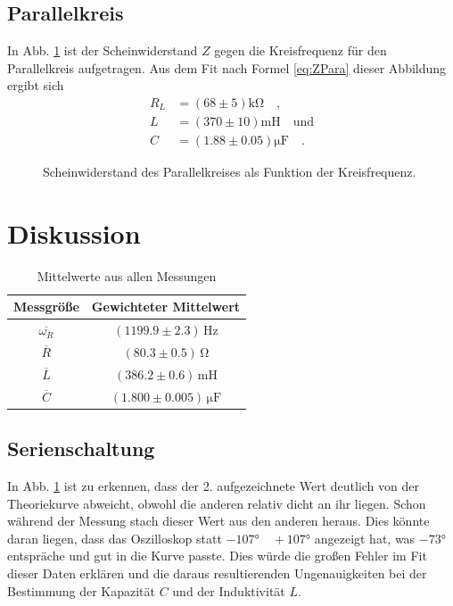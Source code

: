 \documentclass[12pt,a4paper,titlepage,headinclude,bibtotoc]{scrartcl}
\begin{document}
\subsection{Parallelkreis}
In Abb. \ref{fig:messung3} ist der Scheinwiderstand $Z$ gegen die Kreisfrequenz für den Parallelkreis aufgetragen.
Aus dem Fit nach Formel \eqref{eq:ZPara} dieser Abbildung ergibt sich
\begin{align*}
R_L &= (68\pm 5)\si{\kilo\ohm}\quad ,\\
L &= (370 \pm 10)\si{\milli\henry}\quad \text{und}\\
C &= (1.88  \pm 0.05) \si{\micro\farad}\quad .
\end{align*}
\begin{figure}[!htb]
	\centering
	
	\caption{Scheinwiderstand des Parallelkreises als Funktion der Kreisfrequenz.}
	\label{fig:messung3}
\end{figure}

\section{Diskussion}
\label{sec:diskussion}
\renewcommand{\arraystretch}{1.4} 
\begin{table}
\centering
\begin{tabular}{|c|c|}
\hline
Messgröße		&	Gewichteter Mittelwert\\\hline\hline
$\overline{\omega_R}$	&	$(1199.9\pm 2.3)\,\si{\hertz}$\\\hline
$\overline R$		&	$(80.3 \pm 0.5)\,\si{\ohm}$\\\hline
$\overline L$		&	$(386.2 \pm 0.6)\,\si{\milli\henry}$\\\hline
$\overline C$		&	$(1.800 \pm 0.005)\,\si{\micro\farad}$\\\hline
\end{tabular}
\caption{Mittelwerte aus allen Messungen}
\label{tab:mittelwerteserie}
\end{table}

\subsection{Serienschaltung}
In Abb. \ref{fig:messung3} ist zu erkennen, dass der 2. aufgezeichnete Wert deutlich von der Theoriekurve abweicht, obwohl die anderen relativ dicht an ihr liegen.
Schon während der Messung stach dieser Wert aus den anderen heraus.
Dies könnte daran liegen, dass das Oszilloskop statt $-107\si\degree\quad +107\si\degree$ angezeigt hat, was $-73\si\degree$ entspräche und gut in die Kurve passte.
Dies würde die großen Fehler im Fit dieser Daten erklären und die daraus resultierenden Ungenauigkeiten bei der Bestimmung der Kapazität $C$ und der Induktivität $L$.\\
\end{document}
